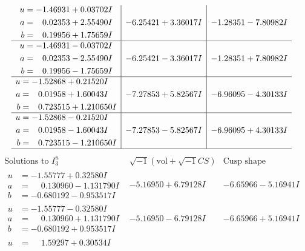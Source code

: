 \documentclass[1p]{elsarticle_modified}
\theoremstyle{definition}
\newcommand{\I}{\sqrt{-1}}
\begin{document}
$$\begin{array}{c|c|c}
\begin{aligned}
u &= -1.46931 + 0.03702 I \\
a &= \phantom{-}0.02353 + 2.55490 I \\
b &= \phantom{-}0.19956 + 1.75659 I\end{aligned}
 & -6.25421 + 3.36017 I & -1.28351 - 7.80982 I \\ \hline\begin{aligned}
u &= -1.46931 - 0.03702 I \\
a &= \phantom{-}0.02353 - 2.55490 I \\
b &= \phantom{-}0.19956 - 1.75659 I\end{aligned}
 & -6.25421 - 3.36017 I & -1.28351 + 7.80982 I \\ \hline\begin{aligned}
u &= -1.52868 + 0.21520 I \\
a &= \phantom{-}0.01958 + 1.60043 I \\
b &= \phantom{-}0.723515 + 1.210650 I\end{aligned}
 & -7.27853 + 5.82567 I & -6.96095 - 4.30133 I \\ \hline\begin{aligned}
u &= -1.52868 - 0.21520 I \\
a &= \phantom{-}0.01958 - 1.60043 I \\
b &= \phantom{-}0.723515 - 1.210650 I\end{aligned}
 & -7.27853 - 5.82567 I & -6.96095 + 4.30133 I\\
 \hline 
 \end{array}$$\newpage$$\begin{array}{c|c|c}  
\text{Solutions to }I^u_{3}& \I (\text{vol} + \sqrt{-1}CS) & \text{Cusp shape}\\
 \hline 
\begin{aligned}
u &= -1.55777 + 0.32580 I \\
a &= \phantom{-}0.130960 - 1.131790 I \\
b &= -0.680192 - 0.953517 I\end{aligned}
 & -5.16950 + 6.79128 I & -6.65966 - 5.16941 I \\ \hline\begin{aligned}
u &= -1.55777 - 0.32580 I \\
a &= \phantom{-}0.130960 + 1.131790 I \\
b &= -0.680192 + 0.953517 I\end{aligned}
 & -5.16950 - 6.79128 I & -6.65966 + 5.16941 I \\ \hline\begin{aligned}
u &= \phantom{-}1.59297 + 0.30534 I \\

\end{aligned}
\end{array}$$
\end{document}

